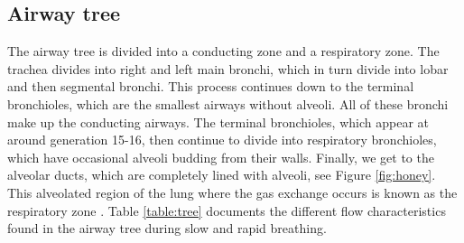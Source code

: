 \subsection{Airway tree} 
The airway tree is divided into a conducting zone and a respiratory zone. The trachea divides into right and left main bronchi, which in turn divide into lobar and then segmental bronchi. This process continues down to the terminal bronchioles, which are the smallest airways without alveoli. All of these bronchi make up the conducting airways. %
The terminal bronchioles, which appear at around generation 15-16, then continue to divide into respiratory bronchioles, which have occasional alveoli budding from their walls. Finally, we get to the alveolar ducts, which are completely lined with alveoli, see Figure \ref{fig:honey}. This alveolated region of the lung where the gas exchange occurs is known as the respiratory zone \citep{west2008respiratory}. Table \ref{table:tree} documents the different flow characteristics found in the airway tree during slow and rapid breathing.
%
%
